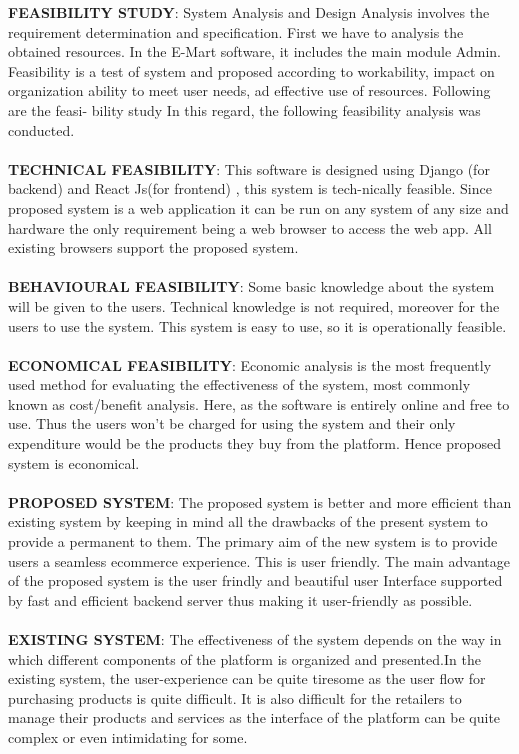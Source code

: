\documentclass[11pt]{report}
\begin{document}
\textbf{FEASIBILITY STUDY}:
System Analysis and Design Analysis involves the requirement determination and specification.
First we have to analysis the obtained resources. In the E-Mart software, it includes the
main module Admin. Feasibility is a test of system and proposed according to workability, impact
on organization ability to meet user needs, ad effective use of resources. Following are the feasi-
bility study In this regard, the following feasibility analysis was conducted.\\
\\\textbf{TECHNICAL FEASIBILITY}:
This software is designed using Django (for backend) and React Js(for frontend) , this system is tech-nically feasible. Since  proposed system is a web application it can be run on any system of any size and hardware the only requirement being a web browser to access the web app. All existing browsers support the proposed system.\\
\\\textbf{BEHAVIOURAL FEASIBILITY}:
Some basic knowledge about the system will be given to the users. Technical knowledge is not
required, moreover for the users to use the system. This system is easy to use, so it is operationally
feasible.\\
\\\textbf{ECONOMICAL FEASIBILITY}:
Economic analysis is the most frequently used method for evaluating the effectiveness of the system, most commonly known as cost/benefit analysis. Here, as the software is entirely online and free to use. Thus the users won’t be charged for using the system and their only expenditure would be the products they buy from the platform. Hence proposed system is economical.\\
\\\textbf{PROPOSED SYSTEM}:
The proposed system is better and more efficient than existing system by keeping in mind all the
drawbacks of the present system to provide a permanent to them. The primary aim of the new
system is to provide users a seamless ecommerce experience. This is user friendly. The
main advantage of the proposed system is the user frindly and beautiful user Interface supported by fast and efficient backend server thus making it user-friendly as possible.\\
\\\textbf{EXISTING SYSTEM}:
The effectiveness of the system depends on the way in which different components of the platform is organized and presented.In the existing system, the user-experience can be quite tiresome as the user flow for purchasing products is quite difficult. It is also difficult for the retailers to manage their products and services as the interface of the platform can be quite complex or even intimidating for some.
\end{document}
